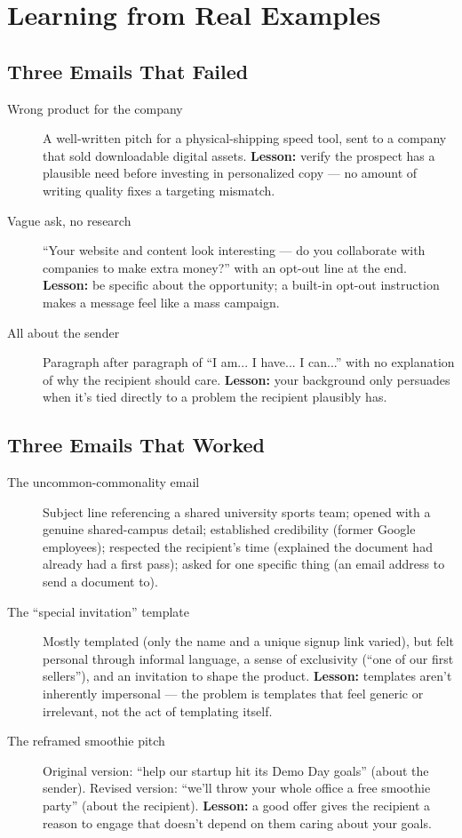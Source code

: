 \section{Learning from Real Examples}

\subsection{Three Emails That Failed}

\begin{description}
  \item[Wrong product for the company] A well-written pitch for a physical-shipping speed tool, sent to a
  company that sold downloadable digital assets. \textbf{Lesson:} verify the prospect has a plausible need
  before investing in personalized copy — no amount of writing quality fixes a targeting mismatch.
  \item[Vague ask, no research] ``Your website and content look interesting — do you collaborate with companies
  to make extra money?'' with an opt-out line at the end. \textbf{Lesson:} be specific about the opportunity; a
  built-in opt-out instruction makes a message feel like a mass campaign.
  \item[All about the sender] Paragraph after paragraph of ``I am... I have... I can...'' with no explanation of
  why the recipient should care. \textbf{Lesson:} your background only persuades when it's tied directly to a
  problem the recipient plausibly has.
\end{description}

\subsection{Three Emails That Worked}

\begin{description}
  \item[The uncommon-commonality email] Subject line referencing a shared university sports team; opened with a
  genuine shared-campus detail; established credibility (former Google employees); respected the recipient's
  time (explained the document had already had a first pass); asked for one specific thing (an email address to
  send a document to).
  \item[The ``special invitation'' template] Mostly templated (only the name and a unique signup link varied),
  but felt personal through informal language, a sense of exclusivity (``one of our first sellers''), and an
  invitation to shape the product. \textbf{Lesson:} templates aren't inherently impersonal — the problem is
  templates that feel generic or irrelevant, not the act of templating itself.
  \item[The reframed smoothie pitch] Original version: ``help our startup hit its Demo Day goals'' (about the
  sender). Revised version: ``we'll throw your whole office a free smoothie party'' (about the recipient).
  \textbf{Lesson:} a good offer gives the recipient a reason to engage that doesn't depend on them caring about
  your goals.
\end{description}

